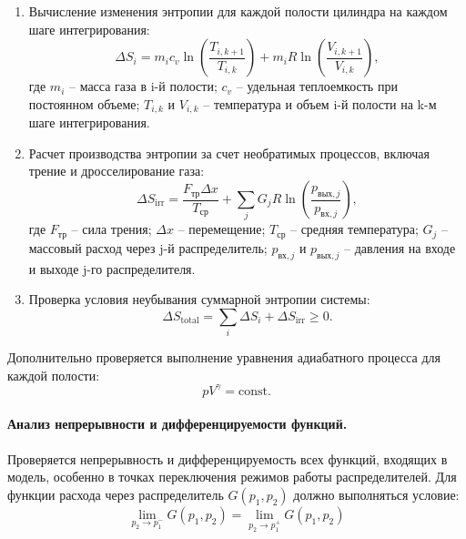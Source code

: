 \begin{enumerate}
    \item Вычисление изменения энтропии для каждой полости цилиндра на каждом шаге интегрирования:
          \begin{equation*}
              \Delta S_i = m_i c_v \ln\left(\frac{T_{i,k+1}}{T_{i,k}}\right) + m_i R \ln\left(\frac{V_{i,k+1}}{V_{i,k}}\right),
          \end{equation*}
          где $m_i$ -- масса газа в i-й полости;
          $c_v$ -- удельная теплоемкость при постоянном объеме;
          $T_{i,k}$ и $V_{i,k}$ -- температура и объем i-й полости на k-м шаге интегрирования.

    \item Расчет производства энтропии за счет необратимых процессов, включая трение и дросселирование газа:
          \begin{equation*}
              \Delta S_{\text{irr}} = \frac{F_{\text{тр}} \Delta x}{T_{\text{ср}}} + \sum_j G_j R \ln\left(\frac{p_{\text{вых},j}}{p_{\text{вх},j}}\right),
          \end{equation*}
          где $F_{\text{тр}}$ -- сила трения;
          $\Delta x$ -- перемещение;
          $T_{\text{ср}}$ -- средняя температура;
          $G_j$ -- массовый расход через j-й распределитель;
          $p_{\text{вх},j}$ и $p_{\text{вых},j}$ -- давления на входе и выходе j-го распределителя.

    \item Проверка условия неубывания суммарной энтропии системы:
          \begin{equation*}
              \Delta S_{\text{total}} = \sum_i \Delta S_i + \Delta S_{\text{irr}} \geq 0.
          \end{equation*}
\end{enumerate}

Дополнительно проверяется выполнение уравнения адиабатного процесса для каждой полости:
\begin{equation*}
    pV^{\gamma} = \text{const}.
\end{equation*}

\paragraph{Анализ непрерывности и дифференцируемости функций.}

Проверяется непрерывность и дифференцируемость всех функций, входящих в модель, особенно в точках переключения
режимов работы распределителей. Для функции расхода через распределитель $G(p_1, p_2)$ должно выполняться условие:
\begin{equation*}
    \lim_{p_2 \to p_1^-} G(p_1, p_2) = \lim_{p_2 \to p_1^+} G(p_1, p_2)
\end{equation*}

